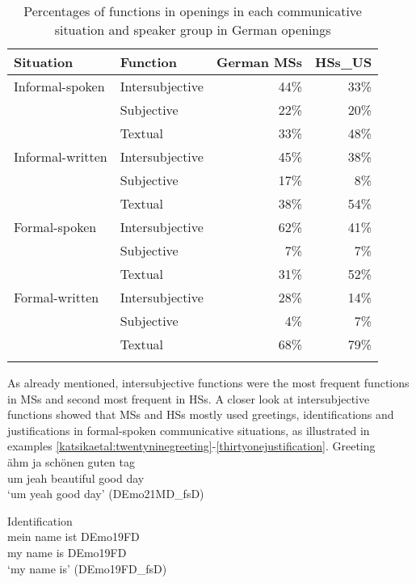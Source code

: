 \documentclass[output=paper,colorlinks,citecolor=brown]{langscibook}
\begin{document}
\begin{table}
\caption{Percentages of functions in openings in each communicative situation and speaker group in German openings}
\label{tab:katsikaetal:Germanfunctiosopen}
 \begin{tabular}{llrr}
   \lsptoprule
    Situation & Function & German MSs & HSs\_US\\
    
 \midrule
  Informal-spoken & Intersubjective & 44\% & 33\%\\
                  & Subjective & 22\% & 20\%\\
                  & Textual & 33\% & 48\%\\
  Informal-written & Intersubjective & 45\% & 38\%\\
                  & Subjective & 17\% & 8\%\\
                  & Textual & 38\% & 54\%\\
  Formal-spoken   & Intersubjective & 62\% & 41\%\\
                  & Subjective & 7\% & 7\%\\
                  & Textual & 31\% & 52\%\\
  Formal-written  & Intersubjective & 28\% & 14\%\\
                  & Subjective & 4\% & 7\%\\
                  & Textual & 68\% & 79\%\\
  \lspbottomrule
  \end{tabular}
  \end{table}

As already mentioned, intersubjective functions were the most frequent functions in MSs and  second most frequent in HSs. A closer look at intersubjective functions showed that MSs and HSs mostly used greetings, identifications and justifications in formal-spoken communicative situations, as illustrated in examples \ref{katsikaetal:twentyninegreeting}-\ref{thirtyonejustification}. 
\pagebreak
\ea \label{katsikaetal:twentyninegreeting} Greeting\\
\gll ähm ja   schönen   guten tag\\
     um  jeah beautiful good  day\\
\glt `um yeah good day' (DEmo21MD\_fsD)
\z

\ea Identification\\ \label{thirtyidentification}
\gll mein name ist DEmo19FD\\
     my   name is  DEmo19FD\\
\glt `my name is' (DEmo19FD\_fsD)
\z
\end{document}
